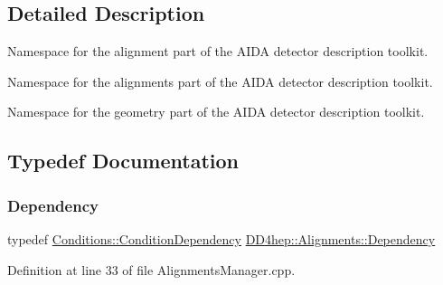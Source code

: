 \subsection{Detailed Description}
Namespace for the alignment part of the A\+I\+DA detector description toolkit. 

Namespace for the alignments part of the A\+I\+DA detector description toolkit.

Namespace for the geometry part of the A\+I\+DA detector description toolkit. 

\subsection{Typedef Documentation}
\hypertarget{namespace_d_d4hep_1_1_alignments_a94aaf200a47dbbcf42c8769eb623ea60}{}\label{namespace_d_d4hep_1_1_alignments_a94aaf200a47dbbcf42c8769eb623ea60} 
\subsubsection{\texorpdfstring{Dependency}{Dependency}}
{\footnotesize\ttfamily typedef \hyperlink{class_d_d4hep_1_1_conditions_1_1_condition_dependency}{Conditions\+::\+Condition\+Dependency} \hyperlink{namespace_d_d4hep_1_1_alignments_a94aaf200a47dbbcf42c8769eb623ea60}{D\+D4hep\+::\+Alignments\+::\+Dependency}}



Definition at line 33 of file Alignments\+Manager.\+cpp.

